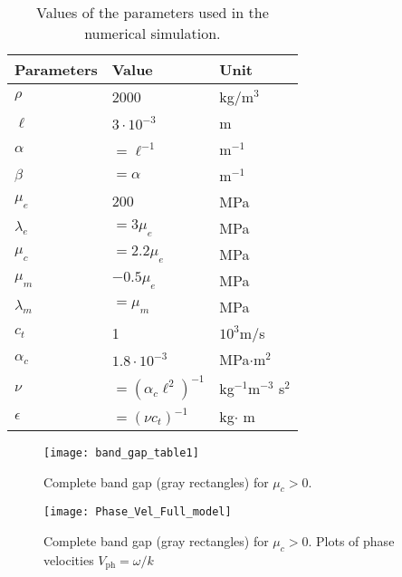 \documentclass[
10pt, %
a4paper, %
oneside, %
headinclude,footinclude, %
BCOR5mm, %
table,
]{scrartcl}
\begin{document}
\begin{table}[]
\begin{center}
	\begin{tabular}{lll}
\hline
		Parameters\hspace{1cm} & Value\hspace{2cm} & Unit \\ \hline
\rowcolor[HTML]{ECF4FF} 
		$ \rho $ & 2000 & kg/m$ ^3 $ \\
\rowcolor[HTML]{CBCEFB} 
		$ \ell  $ & $ 3\cdot10^{-3} $ & m \\
\rowcolor[HTML]{ECF4FF} 
		$ \alpha  $ & $ =\ell^{-1} $ & m$ ^{-1} $ \\
\rowcolor[HTML]{CBCEFB} 
		$ \beta $ & $ =\alpha $ & m$ ^{-1} $	\\
\rowcolor[HTML]{ECF4FF} 
		$ \mu_e $ & $ 200 $ & MPa	\\
\rowcolor[HTML]{CBCEFB} 
		$ \lambda_e $ & $ =3 \mu_e $ & MPa	\\
\rowcolor[HTML]{ECF4FF} 
		$ \mu_c $ & $ =2.2 \mu_e $ & MPa	\\
\rowcolor[HTML]{CBCEFB} 
		$ \mu_m $ & $ -0.5\mu_e $ & MPa	\\
\rowcolor[HTML]{ECF4FF} 
		$ \lambda_m $ & $ =\mu_m $ & MPa	\\
\rowcolor[HTML]{CBCEFB} 
		$ c_t $		& 1	& $ 10^{3} $m/s		\\
\rowcolor[HTML]{ECF4FF} 
		$ \alpha_c $ 	& $ 1.8\cdot10^{-3} $	&	MPa$ \cdot $m$ ^2 $	\\
\rowcolor[HTML]{CBCEFB} 
		$ \nu $	& $ =(\alpha_c \ell^2)^{-1} $	& kg$ ^{-1} $m$ ^{-3} $ s$ ^2 $\\
\rowcolor[HTML]{ECF4FF} 
		$ \epsilon $	& $ =(\nu c_t)^{-1} $	&	kg$ \cdot $ m \\ \hline
	\end{tabular}
	\caption{Values of the parameters used in the numerical simulation.}
	\label{tab.parameters}
\end{center}
\end{table}


\begin{figure}
	\begin{center}
		\texttt{[image: band\_gap\_table1]}
	\end{center}
	\vspace{-4mm}
	\caption{Complete band gap (gray rectangles) for $ \mu_c >0 $.}
	\label{fig.band_gap}
\end{figure}

\begin{figure}
	\begin{center}
		\texttt{[image: Phase\_Vel\_Full\_model]}
	\end{center}
	\vspace{-4mm}
	\caption{Complete band gap (gray rectangles) for $ \mu_c >0 $. Plots of phase velocities $ 
	V_{\text{ph}} = 
	\omega/k $}
	\label{fig.band_gap.phase_vel}
\end{figure}
\end{document}
